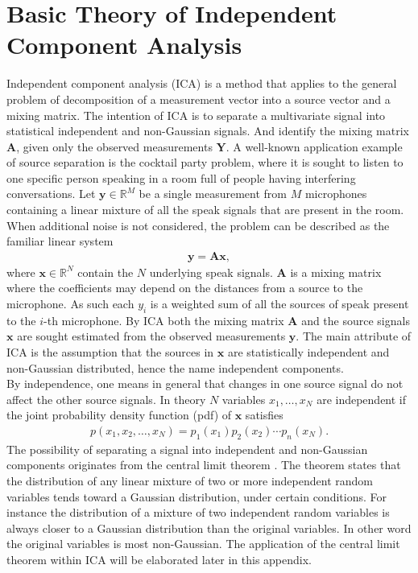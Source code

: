 \section{Basic Theory of Independent Component Analysis}
Independent component analysis (ICA) is a method that applies to the general problem of decomposition of a measurement vector into a source vector and a mixing matrix. 
The intention of ICA is to separate a multivariate signal into statistical independent and non-Gaussian signals. And identify the mixing matrix $\mathbf{A}$, given only the observed measurements $\mathbf{Y}$.
A well-known application example of source separation is the cocktail party problem, where it is sought to listen to one specific person speaking in a room full of people having interfering conversations. 
Let $\mathbf{y} \in \mathbb{R}^M$ be a single measurement from $M$ microphones containing a linear mixture of all the speak signals that are present in the room. 
When additional noise is not considered, the problem can be described as the familiar linear system 
\begin{align}\label{eq:ICA1}
\mathbf{y} = \mathbf{Ax},
\end{align}
where $\mathbf{x} \in \mathbb{R}^N$ contain the $N$ underlying speak signals. $\mathbf{A}$ is a mixing matrix where the coefficients may depend on the distances from a source to the microphone. 
As such each $y_i$ is a weighted sum of all the sources of speak present to the $i$-th microphone.
By ICA both the mixing matrix $\mathbf{A}$ and the source signals $\mathbf{x}$ are sought estimated from the observed measurements $\mathbf{y}$. 
The main attribute of ICA is the assumption that the sources in $\mathbf{x}$ are statistically independent and non-Gaussian distributed, hence the name independent components.
\\     
By independence, one means in general that changes in one source signal do not affect the other source signals. 
In theory $N$ variables $x_1, \dots , x_N$ are independent if the joint probability density function (pdf) of $\mathbf{x}$ satisfies
\begin{align*}
p(x_1, x_2, \dots, x_N) = p_1(x_1) p_2(x_2) \cdots p_n(x_N).
\end{align*}
The possibility of separating a signal into independent and non-Gaussian components originates from the central limit theorem \cite[p. 34]{ICA}. 
The theorem states that the distribution of any linear mixture of two or more independent random variables tends toward a Gaussian distribution, under certain conditions. 
For instance the distribution of a mixture of two independent random variables is always closer to a Gaussian distribution than the original variables. In other word the original variables is most non-Gaussian. 
The application of the central limit theorem within ICA will be elaborated later in this appendix.

